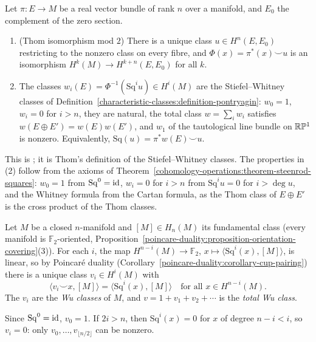 \begin{theorem}[Thom]\label{characteristic-classes:theorem-stiefel-whitney-thom}
Let $\pi \colon E \to M$ be a real vector bundle of rank $n$ over a manifold, and $E_0$ the complement of the zero section.
\begin{enumerate}
\item (Thom isomorphism mod $2$) There is a unique class $u \in H^n(E, E_0)$ restricting to the nonzero class on every fibre, and
$\Phi(x) = \pi^*(x) \smile u$ is an isomorphism $H^k(M) \to H^{k+n}(E, E_0)$ for all $k$.
\item The classes $w_i(E) = \Phi^{-1}(\mathrm{Sq}^i u) \in H^i(M)$ are the Stiefel--Whitney classes of
Definition~\ref{characteristic-classes:definition-pontryagin}: $w_0 = 1$, $w_i = 0$ for $i > n$, they are natural, the total class
$w = \sum_iw_i$ satisfies $w(E \oplus E') = w(E)w(E')$, and $w_1$ of the tautological line bundle on $\mathbb{R}\mathbb{P}^1$ is nonzero. Equivalently,
$\mathrm{Sq}(u) = \pi^*w(E) \smile u$.
\end{enumerate}
\end{theorem}

This is \cite[Chapters 8 and 10]{milnor-stasheff}; it is Thom's definition of the Stiefel--Whitney classes. The properties in (2) follow from the
axioms of Theorem~\ref{cohomology-operations:theorem-steenrod-squares}: $w_0 = 1$ from $\mathrm{Sq}^0 = \mathrm{id}$, $w_i = 0$ for $i > n$ from
$\mathrm{Sq}^iu = 0$ for $i > \deg u$, and the Whitney formula from the Cartan formula, as the Thom class of $E \oplus E'$ is the cross product of
the Thom classes.

\begin{definition}\label{characteristic-classes:definition-wu-classes}
Let $M$ be a closed $n$-manifold and $[M] \in H_n(M)$ its fundamental class (every manifold is $\mathbb{F}_2$-oriented,
Proposition~\ref{poincare-duality:proposition-orientation-covering}(3)). For each $i$, the map $H^{n-i}(M) \to \mathbb{F}_2$,
$x \mapsto \langle\mathrm{Sq}^i(x), [M]\rangle$, is linear, so by Poincar\'e duality (Corollary~\ref{poincare-duality:corollary-cup-pairing}) there is a
unique class $v_i \in H^i(M)$ with
\[
\langle v_i \smile x, [M]\rangle = \langle\mathrm{Sq}^i(x), [M]\rangle \quad \text{for all } x \in H^{n-i}(M).
\]
The $v_i$ are the \emph{Wu classes} of $M$, and $v = 1 + v_1 + v_2 + \cdots$ is the \emph{total Wu class}.
\end{definition}

Since $\mathrm{Sq}^0 = \mathrm{id}$, $v_0 = 1$. If $2i > n$, then $\mathrm{Sq}^i(x) = 0$ for $x$ of degree $n - i < i$, so $v_i = 0$: only
$v_0, \ldots, v_{\lfloor n/2\rfloor}$ can be nonzero.

